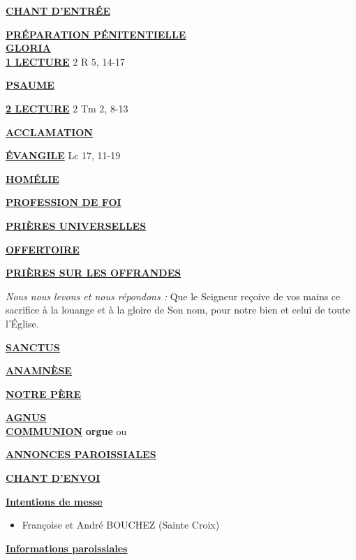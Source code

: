 \documentclass[french,11pt]{article}
\newcommand*{\chants}{../chants}
\newcommand*{\messe}{../messe_du_peuple_de_dieu}
\newcommand*{\pu}{../pu}
\newcommand*{\psaumes}{../psaumes}
\newcommand{\NewsItem}[1]{%
\vspace{3pt}
\underline{\textbf{#1}}
		  }
\begin{document}
\NewsItem{CHANT D'ENTRÉE}
	

\NewsItem{PRÉPARATION PÉNITENTIELLE}\\
	

\NewsItem{GLORIA}\\
	


\NewsItem{1\iere{} LECTURE} 2 R 5, 14-17

\NewsItem{PSAUME}


\NewsItem{2\ieme{} LECTURE} 2 Tm 2, 8-13

\NewsItem{ACCLAMATION}


\NewsItem{ÉVANGILE} Lc 17, 11-19

\NewsItem{HOMÉLIE}

\NewsItem{PROFESSION DE FOI}
%


\NewsItem{PRIÈRES UNIVERSELLES}


\NewsItem{OFFERTOIRE}

\NewsItem{PRIÈRES SUR LES OFFRANDES}
\textit{Nous nous levons et nous répondons : }
Que le Seigneur reçoive de vos mains ce sacrifice à la louange et à la gloire
de Son nom, pour notre bien et celui de toute l’Église.


\NewsItem{SANCTUS}


\NewsItem{ANAMNÈSE}


\NewsItem{NOTRE PÈRE}

\NewsItem{AGNUS} \\


\NewsItem{COMMUNION} \textbf{orgue} ou


\NewsItem{ANNONCES PAROISSIALES}


\NewsItem{CHANT D'ENVOI}


\newpage

\NewsItem{Intentions de messe}
\begin{itemize}
\item[\Cross] Françoise et André BOUCHEZ (Sainte Croix)
\end{itemize}

\NewsItem{Informations paroissiales}
\end{document}
